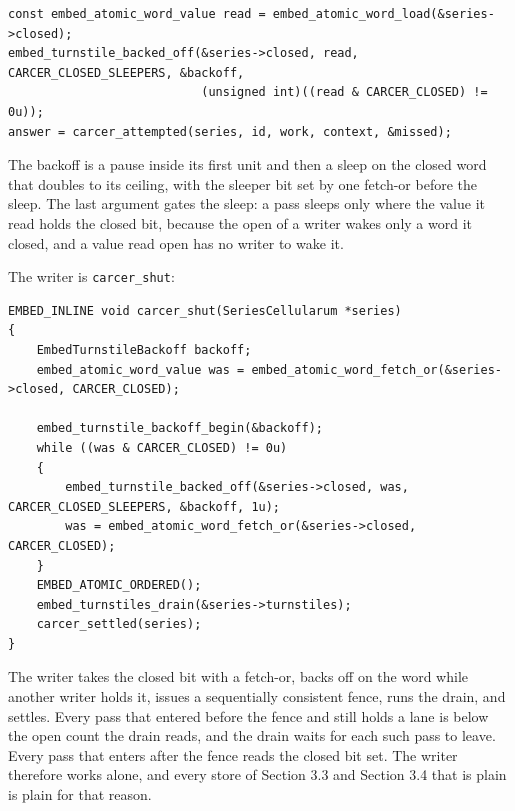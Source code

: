 \begin{Verbatim}
const embed_atomic_word_value read = embed_atomic_word_load(&series->closed);
embed_turnstile_backed_off(&series->closed, read, CARCER_CLOSED_SLEEPERS, &backoff,
                           (unsigned int)((read & CARCER_CLOSED) != 0u));
answer = carcer_attempted(series, id, work, context, &missed);
\end{Verbatim}

The backoff is a pause inside its first unit and then a sleep on the closed word that doubles to its ceiling, with the sleeper bit set by one fetch-or before the sleep. The last argument gates the sleep: a pass sleeps only where the value it read holds the closed bit, because the open of a writer wakes only a word it closed, and a value read open has no writer to wake it.

The writer is \texttt{carcer\_\allowbreak{}shut}:

\begin{Verbatim}
EMBED_INLINE void carcer_shut(SeriesCellularum *series)
{
    EmbedTurnstileBackoff backoff;
    embed_atomic_word_value was = embed_atomic_word_fetch_or(&series->closed, CARCER_CLOSED);

    embed_turnstile_backoff_begin(&backoff);
    while ((was & CARCER_CLOSED) != 0u)
    {
        embed_turnstile_backed_off(&series->closed, was, CARCER_CLOSED_SLEEPERS, &backoff, 1u);
        was = embed_atomic_word_fetch_or(&series->closed, CARCER_CLOSED);
    }
    EMBED_ATOMIC_ORDERED();
    embed_turnstiles_drain(&series->turnstiles);
    carcer_settled(series);
}
\end{Verbatim}

The writer takes the closed bit with a fetch-or, backs off on the word while another writer holds it, issues a sequentially consistent fence, runs the drain, and settles. Every pass that entered before the fence and still holds a lane is below the open count the drain reads, and the drain waits for each such pass to leave. Every pass that enters after the fence reads the closed bit set. The writer therefore works alone, and every store of Section 3.3 and Section 3.4 that is plain is plain for that reason.

